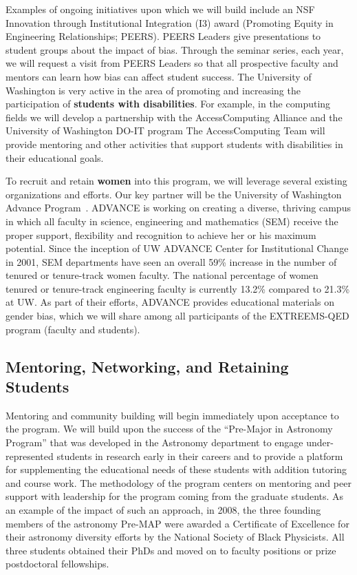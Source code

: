 Examples of ongoing initiatives upon which we will build include an
NSF Innovation through Institutional Integration (I3) award (Promoting
Equity in Engineering Relationships; PEERS). PEERS Leaders give
presentations to student groups about the impact of bias. Through the
seminar series, each year, we will request a visit from PEERS Leaders
so that all prospective faculty and mentors can learn how bias can
affect student success.  The University of Washington is very active
in the area of promoting and increasing the participation of {\bf
  students with disabilities}. For example, in the computing fields we
will develop a partnership with the AccessComputing Alliance
and the University
of Washington DO-IT program
The AccessComputing Team will provide mentoring and other activities
that support students with disabilities in their educational goals.

To recruit and retain {\bf women} into this program, we will leverage
several existing organizations and efforts.  Our key partner will be
the University of Washington Advance Program~\cite{x}.  ADVANCE is
working on creating a diverse, thriving campus in which all faculty in
science, engineering and mathematics (SEM) receive the proper support,
flexibility and recognition to achieve her or his maximum
potential. Since the inception of UW ADVANCE Center for Institutional
Change in 2001, SEM departments have seen an overall 59\% increase in
the number of tenured or tenure-track women faculty. The national
percentage of women tenured or tenure-track engineering faculty is
currently 13.2\% compared to 21.3\% at UW. As part of their efforts,
ADVANCE provides educational materials on gender bias, which we will
share among all participants of the EXTREEMS-QED program (faculty and
students). 

\subsection{Mentoring, Networking, and Retaining Students}

Mentoring and community building will begin immediately upon
acceptance to the program. We will build upon the success of the
``Pre-Major in Astronomy Program'' \cite{garner2010diversity} that was
developed in the Astronomy department to engage under-represented
students in research early in their careers and to provide a platform
for supplementing the educational needs of these students with
addition tutoring and course work. The methodology of the program
centers on mentoring and peer support with leadership for the program
coming from the graduate students.  As an example of the impact of
such an approach, in 2008, the three founding members of the astronomy
Pre-MAP were awarded a Certificate of Excellence for their astronomy
diversity efforts by the National Society of Black Physicists. All
three students obtained their PhDs and moved on to faculty positions
or prize postdoctoral fellowships.

